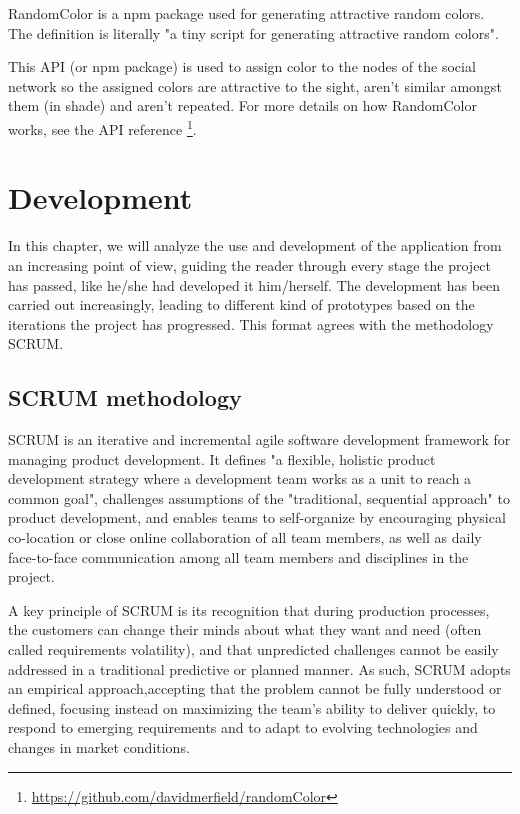 \documentclass[a4paper, 12pt]{book}
\begin{document}
RandomColor is a npm package used for generating attractive random colors. The definition is literally "a tiny script for generating attractive random colors". 

This API (or npm package) is used to assign color to the nodes of the social network so the assigned colors are attractive to the sight, aren’t similar amongst them (in shade) and aren’t repeated. For more details on how RandomColor works, see the API reference \footnote{\url{https://github.com/davidmerfield/randomColor}}.




\chapter{Development}

In this chapter, we will analyze the use and development of the application from an increasing point of view, guiding the reader through every stage the project has passed, like he/she had developed it him/herself. The development has been carried out increasingly, leading to different kind of prototypes based on the iterations the project has progressed. This format agrees with the methodology SCRUM.

\section{SCRUM methodology}
SCRUM is an iterative and incremental agile software development framework for managing product development. It defines "a flexible, holistic product development strategy where a development team works as a unit to reach a common goal", challenges assumptions of the "traditional, sequential approach" to product development, and enables teams to self-organize by encouraging physical co-location or close online collaboration of all team members, as well as daily face-to-face communication among all team members and disciplines in the project.

A key principle of SCRUM is its recognition that during production processes, the customers can change their minds about what they want and need (often called requirements volatility), and that unpredicted challenges cannot be easily addressed in a traditional predictive or planned manner. As such, SCRUM adopts an empirical approach,accepting that the problem cannot be fully understood or defined, focusing instead on maximizing the team's ability to deliver quickly, to respond to emerging requirements and to adapt to evolving technologies and changes in market conditions.
\end{document}
